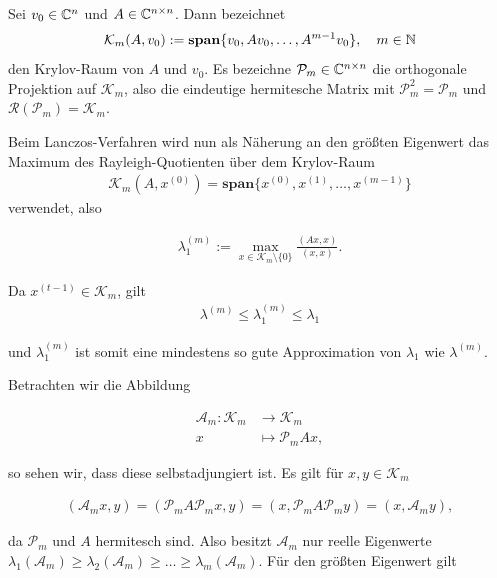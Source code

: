 \documentclass{article}
\begin{document}
\begin{definition}
	Sei $v_0 \in \mathbb{C}^{n}$ und $A \in \mathbb{C}^{n \times n}$. Dann bezeichnet
	\begin{align*}
		\mathcal{K}_m(A,v_0) := \textbf{span}\{v_0, Av_0, \dots, A^{m-1}v_0\}, \quad m \in \mathbb{N}
	\end{align*}
	den Krylov-Raum von $A$ und $v_0$. Es bezeichne $\mathcal{P}_m \in \mathbb{C}^{n \times n}$ die orthogonale Projektion auf $\mathcal{K}_m$, also die eindeutige hermitesche Matrix mit $\mathcal{P}_m^2 = \mathcal{P}_m$ und $\mathcal{R}(\mathcal{P}_m) = \mathcal{K}_m$.
\end{definition}

Beim Lanczos-Verfahren wird nun als Näherung an den größten Eigenwert das Maximum des Rayleigh-Quotienten über dem Krylov-Raum
\begin{align*}
	\mathcal{K}_m(A,x^{(0)}) = \textbf{span}\{x^{(0)}, x^{(1)}, \dots , x^{(m-1)} \}
\end{align*}
verwendet, also

\begin{align*}
	\lambda_1^{(m)} := \max_{x \in \mathcal{K}_m \setminus \{0\}} \frac{(Ax,x)}{(x,x)}.
\end{align*}

Da $x^{(t-1)} \in \mathcal{K}_m$, gilt
\begin{align*}
	\lambda^{(m)} \leq \lambda_1^{(m)} \leq \lambda_1
\end{align*}

und $\lambda_1^{(m)}$ ist somit eine mindestens so gute Approximation von $\lambda_1$ wie $\lambda^{(m)}$.

Betrachten wir die Abbildung

\begin{align*}
	\mathcal{A}_m: \mathcal{K}_m &\to \mathcal{K}_m \\
	x &\mapsto \mathcal{P}_m Ax,
\end{align*}

so sehen wir, dass diese selbstadjungiert ist. Es gilt für $x,y \in \mathcal{K}_m$

\begin{align*}
	(\mathcal{A}_mx, y) = (\mathcal{P}_m A \mathcal{P}_m x, y) = (x, \mathcal{P}_m A \mathcal{P}_m y) = (x, \mathcal{A}_m y),
\end{align*}

da $\mathcal{P}_m$ und $A$ hermitesch sind. Also besitzt $ \mathcal{A}_m$ nur reelle Eigenwerte $\lambda_1(\mathcal{A}_m) \geq \lambda_2(\mathcal{A}_m) \geq \dots \geq \lambda_m(\mathcal{A}_m)$. Für den größten Eigenwert gilt
\end{document}
